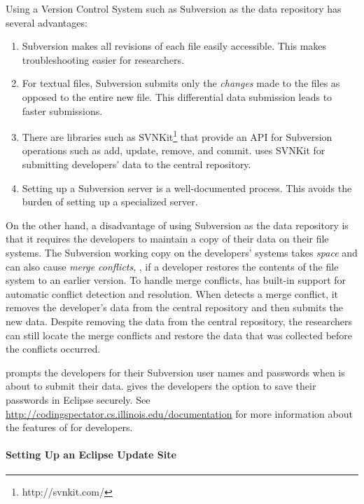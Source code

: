 Using a Version Control System such as Subversion as the data repository has
several advantages:

\begin{enumerate}
%
\item Subversion makes all revisions of each file easily accessible. This makes
  troubleshooting easier for researchers.
%
\item For textual files, Subversion submits only the \emph{changes} made to the
  files as opposed to the entire new file. This differential data submission
  leads to faster submissions.
%
\item There are libraries such as SVNKit\footnote{http://svnkit.com/} that
  provide an API for Subversion operations such as add, update, remove, and
  commit. \CodingSpectator{} uses SVNKit for submitting developers' data to the
  central repository.
%
\item Setting up a Subversion server is a well-documented process. This avoids
  the burden of setting up a specialized server.
%
\end{enumerate}

On the other hand, a disadvantage of using Subversion as the data repository is
that it requires the developers to maintain a copy of their data on their file
systems. The Subversion working copy on the developers' systems takes \emph{space}
and can also cause \emph{merge conflicts}, \eg, if a developer restores the contents
of the file system to an earlier version. To handle merge conflicts,
\CodingSpectator{} has built-in support for automatic conflict detection and
resolution. When \CodingSpectator{} detects a merge conflict, it removes the
developer's data from the central repository and then submits the new data. Despite
removing the data from the central repository, the researchers can still locate
the merge conflicts and restore the data that was collected before the conflicts occurred.

\CodingSpectator{} prompts the developers for their Subversion user names and
passwords when \CodingSpectator{} is about to submit their data.
\CodingSpectator{} gives the developers the option to save their passwords in Eclipse
securely. See \url{http://codingspectator.cs.illinois.edu/documentation} for
more information about the features of \CodingSpectator{} for developers.

\paragraph{Setting Up an Eclipse Update Site}

